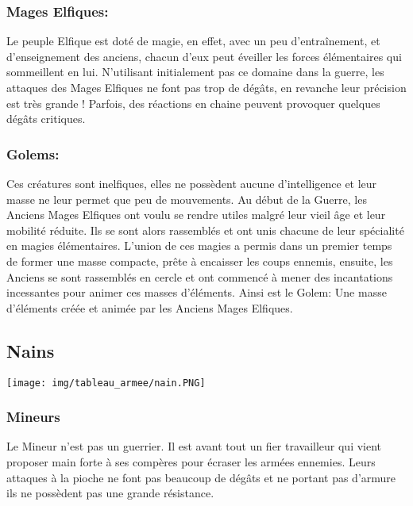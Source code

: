 \documentclass[a4paper]{article}
\begin{document}
	\subsubsection{Mages Elfiques: }
	
 	\quad Le peuple Elfique est doté de magie, en effet, avec un peu d'entraînement, et d'enseignement des anciens, chacun d'eux peut éveiller les forces élémentaires qui sommeillent en lui. N'utilisant initialement pas ce domaine dans la guerre, les attaques des Mages Elfiques ne font pas trop de dégâts, en revanche leur précision est très grande ! Parfois, des réactions en chaine peuvent provoquer quelques dégâts critiques.
 	
 	\subsubsection{Golems: }
 	
 	\quad Ces créatures sont inelfiques, elles ne possèdent aucune d'intelligence et leur masse ne leur permet que peu de mouvements. Au début de la Guerre, les Anciens Mages Elfiques ont voulu se rendre utiles malgré leur vieil âge et leur mobilité réduite. Ils se sont alors rassemblés et ont unis chacune de leur spécialité en magies élémentaires. L'union de ces magies a permis dans un premier temps de former une masse compacte, prête à encaisser les coups ennemis, ensuite, les Anciens se sont rassemblés en cercle et ont commencé à mener des incantations incessantes pour animer ces masses d'éléments. Ainsi est le Golem: Une masse d'éléments créée et animée par les Anciens Mages Elfiques.

	\newpage
\subsection{Nains}


	\texttt{[image: img/tableau\_armee/nain.PNG]}
		
	\subsubsection{Mineurs}

	\quad Le Mineur n'est pas un guerrier. Il est avant tout un fier travailleur qui vient proposer main forte à ses compères pour écraser les armées ennemies. Leurs attaques à la pioche ne font pas beaucoup de dégâts et ne portant pas d'armure ils ne possèdent pas une grande résistance.
\end{document}
